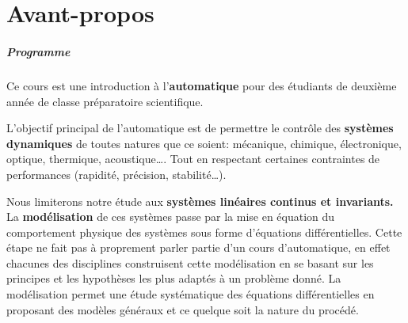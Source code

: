 \chapter*{Avant-propos}
\paragraph{Programme}
Ce cours est une introduction à l'\textbf{automatique}
pour des étudiants de deuxième année de classe préparatoire scientifique.

L'objectif principal de l'automatique est de permettre
le contrôle des \textbf{systèmes dynamiques}
de toutes natures que ce soient: mécanique, chimique, 
électronique, optique, thermique, acoustique\ldots.
Tout en respectant certaines contraintes de performances 
(rapidité, précision, stabilité\ldots).

Nous limiterons notre étude aux \textbf{systèmes linéaires continus et 
invariants.} La \textbf{modélisation} de ces systèmes passe par la mise 
en équation du comportement physique des systèmes sous forme d'équations 
différentielles. Cette étape ne fait pas à proprement parler partie d'un 
cours d'automatique, en effet chacunes des disciplines construisent cette 
modélisation en se basant sur les principes et les hypothèses les plus 
adaptés à un problème donné.
La modélisation permet une étude systématique des équations différentielles 
en proposant des modèles généraux et ce quelque soit la nature du procédé.

